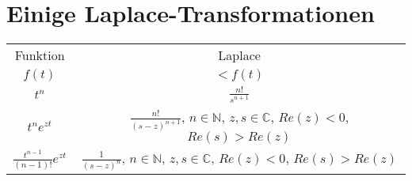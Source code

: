 \section{Einige Laplace-Transformationen}
\begin{center}
\begin{tabular}{|c|c|}
\hline
\rule[-1ex]{0pt}{2.5ex} Funktion & Laplace \\  
\rule[-1ex]{0pt}{2.5ex} $f(t)$ & $\lt{f(t)}$ \\
\hline
\rule[-1ex]{0pt}{2.5ex} $t^n$ & $\frac{n!}{s^{n+1}}$\label{lt:t_n}\\
\hline
\rule[-1ex]{0pt}{2.5ex} $t^n e^{zt}$ & $\frac{n!}{(s-z)^{n+1}}$, $n\in \mathbb{N}$, $z, s \in \mathbb{C}$, $Re(z) < 0$, $Re(s) > Re(z)$  \\  
\hline 
\rule[-1ex]{0pt}{2.5ex} $\frac{t^{n-1}}{(n-1)!} e^{zt}$ & $\frac{1}{(s-z)^{n}}$, $n\in \mathbb{N}$, $z, s \in \mathbb{C}$, $Re(z) < 0$, $Re(s) > Re(z)$  \label{lt:exp} \\  
\hline
\end{tabular} 
\end{center}
